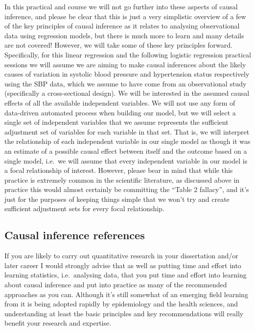 \documentclass[
]{book}
\begin{document}
In this practical and course we will not go further into these aspects of causal inference, and please be clear that this is just a very simplistic overview of a few of the key principles of causal inference as it relates to analysing observational data using regression models, but there is much more to learn and many details are not covered! However, we will take some of these key principles forward. Specifically, for this linear regression and the following logistic regression practical sessions we will assume we are aiming to make causal inferences about the likely causes of variation in systolic blood pressure and hypertension status respectively using the SBP data, which we assume to have come from an observational study (specifically a cross-sectional design). We will be interested in the assumed causal effects of all the available independent variables. We will not use any form of data-driven automated process when building our model, but we will select a single set of independent variables that we assume represents the sufficient adjustment set of variables for each variable in that set. That is, we will interpret the relationship of each independent variable in our single model as though it was an estimate of a possible causal effect between itself and the outcome based on a single model, i.e.~we will assume that every independent variable in our model is a focal relationship of interest. However, please bear in mind that while this practice is extremely common in the scientific literature, as discussed above in practice this would almost certainly be committing the ``Table 2 fallacy'', and it's just for the purposes of keeping things simple that we won't try and create sufficient adjustment sets for every focal relationship.

\hypertarget{causal-inference-references}{%
\subsection{Causal inference references}\label{causal-inference-references}}

If you are likely to carry out quantitative research in your dissertation and/or later career I would strongly advise that as well as putting time and effort into learning statistics, i.e.~analysing data, that you put time and effort into learning about causal inference and put into practice as many of the recommended approaches as you can. Although it's still somewhat of an emerging field learning from it is being adopted rapidly by epidemiology and the health sciences, and understanding at least the basic principles and key recommendations will really benefit your research and expertise.
\end{document}
